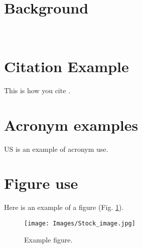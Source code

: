 \section{Background}
\blindtext \\

\section{Citation Example}
This is how you cite \cite{savitzky,Harvey2002}.\\

\section{Acronym examples}
\gls{US} is an example of acronym use.\\
\newpage
\section{Figure use}
Here is an example of a figure (Fig. \ref{fig:example}).\\

 \begin{figure}[!ht]
    \centering
    \texttt{[image: Images/Stock\_image.jpg]}
    \caption{Example figure.}
    \label{fig:example}
\end{figure}

